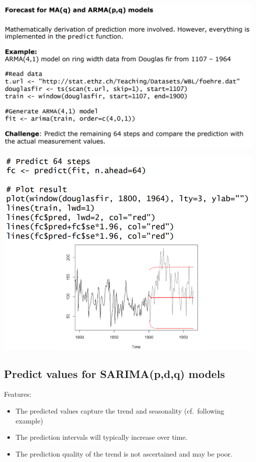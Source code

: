 \documentclass[
]{article}
\providecommand{\tightlist}{%
  \setlength{\itemsep}{0pt}\setlength{\parskip}{0pt}}
\begin{document}
\includegraphics[width=1\linewidth]{forecastma}

\includegraphics[width=1\linewidth]{maarma}

\hypertarget{predict-values-for-sarimapdq-models}{%
\subsection{Predict values for SARIMA(p,d,q)
models}\label{predict-values-for-sarimapdq-models}}

Features:

\begin{itemize}
\tightlist
\item
  The predicted values capture the trend and seasonality (cf.~following
  example)
\item
  The prediction intervals will typically increase over time.
\item
  The prediction quality of the trend is not ascertained and may be
  poor.
\end{itemize}
\end{document}
